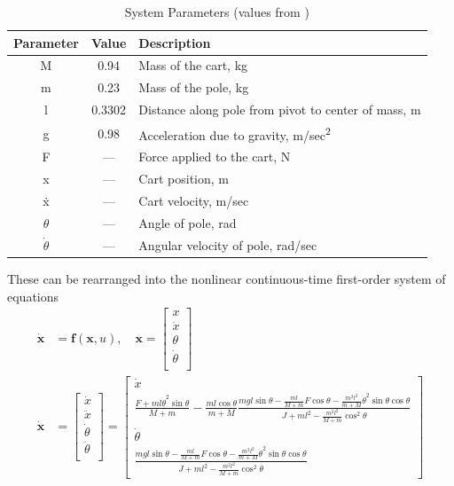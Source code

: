 \documentclass{article}
\newcommand{\matr}[1]{\bm{#1}}     %
\begin{document}
\begin{table}[h!]
 \centering
  \renewcommand{\arraystretch}{1.5}
 \begin{tabular}{ |c |c  |l |}
 \hline
 	 \textbf{Parameter} & \textbf{Value} & \textbf{Description}  \\ \hline
 	 M & 0.94 & Mass of the cart, kg \\ \hline
 	 m & 0.23 & Mass of the pole, kg \\ \hline
 	 l & 0.3302 & Distance along pole from pivot to center of mass, m \\ \hline
 	 g & 0.98 & Acceleration due to gravity, m/{sec\textsuperscript{2}} \\ \hline
 	 F & --- & Force applied to the cart, N \\ \hline
 	 x & --- & Cart position, m \\ \hline
 	 \.x & --- & Cart velocity, m/sec \\ \hline
 	 $\theta$ & --- & Angle of pole, rad \\ \hline
 	 $\dot\theta$ & --- & Angular velocity of pole, rad/sec \\ \hline
 \end{tabular}
 \caption{System Parameters (values from \cite{lab6})}
 \label{table:paramvalues}
 \end{table}
These can be rearranged into the nonlinear continuous-time first-order system of equations
\begin{equation}
\begin{aligned}
\matr{\dot{x}} &= \matr{f}(\matr{x},u),\quad  \matr{x} = \begin{bmatrix}
	x \\
	\dot{x} \\
	\theta \\
	\dot{\theta} \\
\end{bmatrix} \\
\matr{\dot{x}} &= \begin{bmatrix}
	\dot{x} \\
	\ddot{x} \\
	\dot{\theta} \\
	\ddot{\theta} \\
\end{bmatrix} = \begin{bmatrix}
\dot{x} \\
\frac{F+ml\dot{\theta}^2\sin\theta}{M+m} -\frac{ml\cos\theta}{m+M}\frac{mgl\sin\theta- \frac{ml}{M+m} F\cos\theta -\frac{m^2l^2}{m+M}\dot{\theta}^2\sin\theta\cos\theta}{J+ml^2-\frac{m^2l^2}{M+m}\cos^2 \theta} \\[6pt]
\dot{\theta} \\
\frac{mgl\sin\theta - \frac{ml}{M+m} F\cos\theta -\frac{m^2l^2}{m+M}\dot{\theta}^2\sin\theta\cos\theta}{J+ml^2-\frac{m^2l^2}{M+m}\cos^2 \theta }
\end{bmatrix}
\end{aligned}
\label{eq:nonlinear_ss_continuous}
\end{equation}
\end{document}

